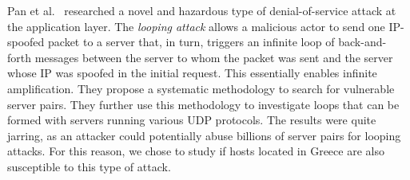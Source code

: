  Pan et al.~\cite{cispa-loopy} researched a novel and hazardous type of denial-of-service attack at the application layer. The \textit{looping attack} allows a malicious actor to send one IP-spoofed packet to a server that, in turn, triggers an infinite loop of back-and-forth messages between the server to whom the packet was sent and the server whose IP was spoofed in the initial request. This essentially enables infinite amplification. They propose a systematic methodology to search for vulnerable server pairs. They further use this methodology to investigate loops that can be formed with servers running various UDP protocols. The results were quite jarring, as an attacker could potentially abuse billions of server pairs for looping attacks. For this reason, we chose to study if hosts located in Greece are also susceptible to this type of attack. 



